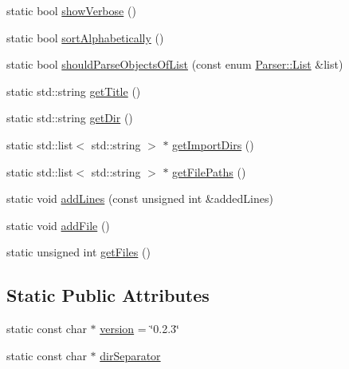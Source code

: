 \begin{CompactItemize}
static bool \hyperlink{classvjassdoc_1_1Vjassdoc_def212f6d705e55cab5211271e63a6a0}{showVerbose} ()
\item 
static bool \hyperlink{classvjassdoc_1_1Vjassdoc_6c9c4ca961a2c19801261be4c6f1922c}{sortAlphabetically} ()
\item 
static bool \hyperlink{classvjassdoc_1_1Vjassdoc_d4502ac69ac8bd526d813606a7081d41}{shouldParseObjectsOfList} (const enum \hyperlink{classvjassdoc_1_1Parser_4ef39527519272daf05a22b5276062ad}{Parser::List} \&list)
\item 
static std::string \hyperlink{classvjassdoc_1_1Vjassdoc_7ba3ab042719acc2ca719ea6936345bc}{getTitle} ()
\item 
static std::string \hyperlink{classvjassdoc_1_1Vjassdoc_212f33c8cf9c9be734cfbf9cfb040025}{getDir} ()
\item 
static std::list$<$ std::string $>$ $\ast$ \hyperlink{classvjassdoc_1_1Vjassdoc_556e1fe15a58becec3da4e281bf73f09}{getImportDirs} ()
\item 
static std::list$<$ std::string $>$ $\ast$ \hyperlink{classvjassdoc_1_1Vjassdoc_6b27e1cf9a3a03f9d8d2157e4b831a29}{getFilePaths} ()
\item 
static void \hyperlink{classvjassdoc_1_1Vjassdoc_af08606e734200e4c99860a6867216e5}{addLines} (const unsigned int \&addedLines)
\item 
static void \hyperlink{classvjassdoc_1_1Vjassdoc_7aa83fb64697927220f66616cf30e982}{addFile} ()
\item 
static unsigned int \hyperlink{classvjassdoc_1_1Vjassdoc_c0b832c86853f4f65c4eb28150808658}{getFiles} ()
\end{CompactItemize}
\subsection*{Static Public Attributes}
\begin{CompactItemize}
\item 
static const char $\ast$ \hyperlink{classvjassdoc_1_1Vjassdoc_229bee6b4735e83a9a28b98eb4650eef}{version} = \char`\"{}0.2.3\char`\"{}
\item 
static const char $\ast$ \hyperlink{classvjassdoc_1_1Vjassdoc_f3b3e3dfe26a57385265f8ba0d4fef16}{dirSeparator}
\end{CompactItemize}


